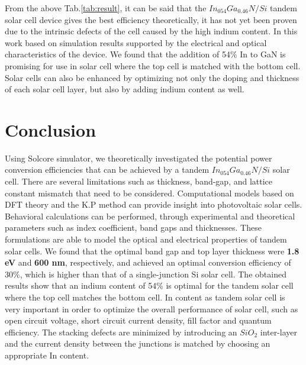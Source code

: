 \documentclass[preprint,12pt]{elsarticle}
\begin{document}
From the above Tab.\ref{tab:result}, it can be said that the $In_{054}Ga_{0.46}N/Si$ tandem solar cell device gives the best efficiency theoretically, it has not yet been proven due to the intrinsic defects of the cell caused by the high indium content. In this work based on simulation results supported by the electrical and optical characteristics of the device. We found that the addition of 54\% In to GaN is promising for use in solar cell where the top cell is matched with the bottom cell. Solar cells can also be enhanced by optimizing not only the doping and thickness of each solar cell layer, but also by adding indium content as well.

\section{Conclusion} \label{sec:Con}

Using Solcore simulator, we theoretically investigated the potential power conversion efficiencies that can be achieved by a tandem $In_{054}Ga_{0.46}N/Si$ solar cell. There are several limitations such as thickness, band-gap, and lattice constant mismatch that need to be considered. Computational models based on DFT theory and the K.P method can provide insight into photovoltaic solar cells. Behavioral calculations can be performed, through experimental and theoretical parameters such as index coefficient, band gaps and thicknesses. These formulations are able to model the optical and electrical properties of tandem solar cells. We found that the optimal band gap and top layer thickness were \textbf{1.8 eV} and \textbf{600 nm}, respectively, and achieved an optimal conversion efficiency of 30\%, which is higher than that of a single-junction Si solar cell. The obtained results show that an indium content of 54\% is optimal for the tandem solar cell where the top cell matches the bottom cell. In content as tandem solar cell is very important in order to optimize the overall performance of solar cell, such as open circuit voltage, short circuit current density, fill factor and quantum efficiency. The stacking defects are minimized by introducing an $SiO_{2}$ inter-layer and the current density between the junctions is matched by choosing an appropriate In content.

 






\end{document}
